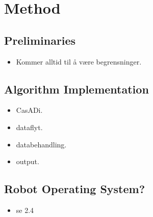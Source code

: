 \section{Method}
\subsection{Preliminaries}
\begin{itemize}
    \item Kommer alltid til å være begrensninger.
\end{itemize}

\subsection{Algorithm Implementation}
\begin{itemize}
    \item CasADi.
    \item dataflyt.
    \item databehandling.
    \item output.
\end{itemize}

\subsection{Robot Operating System?}
\begin{itemize}
    \item se 2.4
\end{itemize}


\newpage